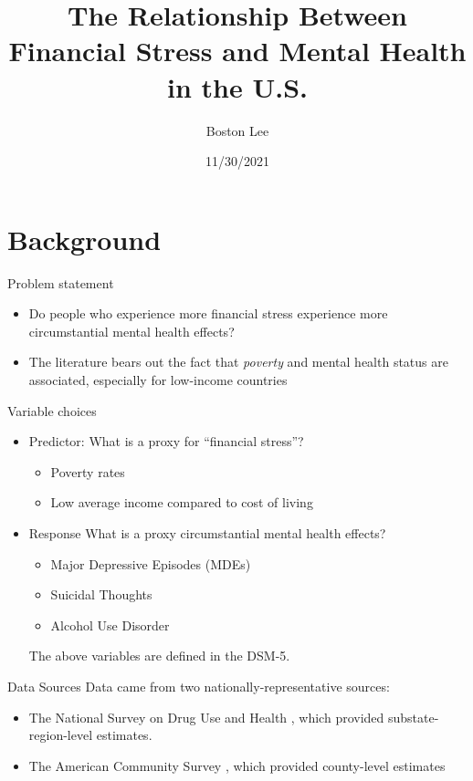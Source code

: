 \documentclass{beamer}
\title{The Relationship Between Financial Stress and Mental Health in the U.S.}
\author{Boston Lee}
\institute{Colorado State University, Honors Program}
\date{11/30/2021}
\begin{document}
\begin{frame}
  \titlepage
\end{frame}

\section{Background}

\begin{frame}{Problem statement}
\begin{itemize}
    \item Do people who experience more financial stress experience
        more circumstantial mental health effects?
    \item The literature bears out the fact that
        \textit{poverty} and mental health
        status are associated, especially for low-income countries\\
\end{itemize}
\end{frame}

\begin{frame}{Variable choices}
\begin{itemize}
    \item Predictor: What is a proxy for ``financial stress''?
        \begin{itemize}
            \item Poverty rates\\
            \item Low average income compared to cost of living\\
        \end{itemize}
    \item Response What is a proxy circumstantial mental health effects?
        \begin{itemize}
            \item Major Depressive Episodes (MDEs)
            \item Suicidal Thoughts
            \item Alcohol Use Disorder
        \end{itemize}

        The above variables are defined in the DSM-5.
\end{itemize}
\end{frame}

\begin{frame}{Data Sources}
Data came from two nationally-representative sources:
\begin{itemize}
    \item The National Survey on Drug Use and Health
                    \cite{acs_demographics_data}
                    \cite{acs_poverty_data}
                    \cite{acs_income_data}
                    \cite{acs_marital_data}
                    \cite{acs_education_data},
          which provided substate-region-level estimates.\\
    \item The American Community Survey \cite{samhsa_data},
        which provided county-level estimates\\
\end{itemize}
\end{frame}
\end{document}

